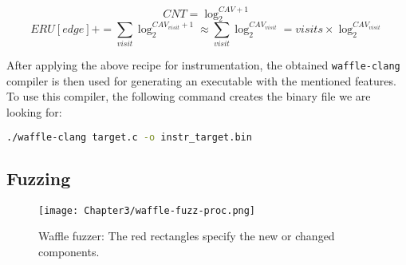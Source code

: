 \begin{equation}\label{eq:log}
  CNT = \log_{2}^{CAV+1}
\end{equation}
\begin{equation}\label{eq:ERU-log}
  ERU[edge] += \sum_{visit} \log_{2}^{CAV_{visit}+1} \approx \sum_{visit} \log_{2}^{CAV_{visit}} = visits \times \log_{2}^{CAV_{visit}}
\end{equation}



After applying the above recipe for instrumentation, the obtained \texttt{waffle-clang} compiler is then used for generating an executable with the mentioned features. To use this compiler, the following command creates the binary file we are looking for:

\begin{lstlisting}[language=bash,style=CommandStyle,label={lst:wafl-clang}]
  ./waffle-clang target.c -o instr_target.bin
\end{lstlisting}


\subsection{Fuzzing}



\begin{figure}[!b]
  \texttt{[image: Chapter3/waffle-fuzz-proc.png]}
  \centering
  \caption{Waffle fuzzer: The red rectangles specify the new or changed components.}
  \label{fig:waffle-fuzz-proc}
\end{figure}

